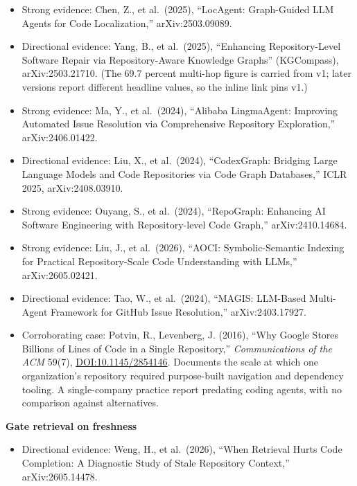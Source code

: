 \begin{itemize}
\tightlist
\item
  Strong evidence: Chen, Z., et al.~(2025), ``LocAgent: Graph-Guided LLM Agents for Code Localization,'' arXiv:2503.09089.
\item
  Directional evidence: Yang, B., et al.~(2025), ``Enhancing Repository-Level Software Repair via Repository-Aware Knowledge Graphs'' (KGCompass), arXiv:2503.21710. (The 69.7 percent multi-hop figure is carried from v1; later versions report different headline values, so the inline link pins v1.)
\item
  Strong evidence: Ma, Y., et al.~(2024), ``Alibaba LingmaAgent: Improving Automated Issue Resolution via Comprehensive Repository Exploration,'' arXiv:2406.01422.
\item
  Directional evidence: Liu, X., et al.~(2024), ``CodexGraph: Bridging Large Language Models and Code Repositories via Code Graph Databases,'' ICLR 2025, arXiv:2408.03910.
\item
  Strong evidence: Ouyang, S., et al.~(2024), ``RepoGraph: Enhancing AI Software Engineering with Repository-level Code Graph,'' arXiv:2410.14684.
\item
  Strong evidence: Liu, J., et al.~(2026), ``AOCI: Symbolic-Semantic Indexing for Practical Repository-Scale Code Understanding with LLMs,'' arXiv:2605.02421.
\item
  Directional evidence: Tao, W., et al.~(2024), ``MAGIS: LLM-Based Multi-Agent Framework for GitHub Issue Resolution,'' arXiv:2403.17927.
\item
  Corroborating case: Potvin, R., Levenberg, J. (2016), ``Why Google Stores Billions of Lines of Code in a Single Repository,'' \emph{Communications of the ACM} 59(7), \href{https://doi.org/10.1145/2854146}{DOI:10.1145/2854146}. Documents the scale at which one organization's repository required purpose-built navigation and dependency tooling. A single-company practice report predating coding agents, with no comparison against alternatives.
\end{itemize}

\textbf{Gate retrieval on freshness}

\begin{itemize}
\tightlist
\item
  Directional evidence: Weng, H., et al.~(2026), ``When Retrieval Hurts Code Completion: A Diagnostic Study of Stale Repository Context,'' arXiv:2605.14478.
\end{itemize}
